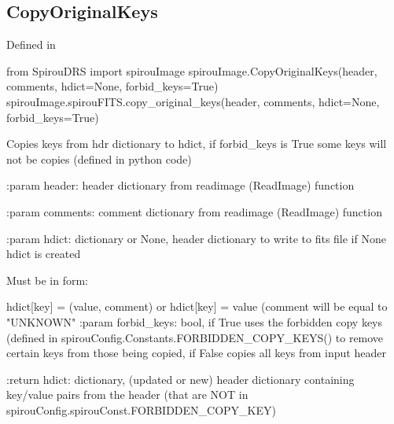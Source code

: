 
\noindent\begin{minipage}{\textwidth}
\subsection{CopyOriginalKeys}

Defined in \spirouImage{}

\begin{pythonbox}
from SpirouDRS import spirouImage
spirouImage.CopyOriginalKeys(header, comments, hdict=None, forbid_keys=True)
spirouImage.spirouFITS.copy_original_keys(header, comments, hdict=None, forbid_keys=True)
\end{pythonbox}

\begin{pythondocstring}
Copies keys from hdr dictionary to hdict, if forbid_keys is True some
keys will not be copies (defined in python code)

:param header: header dictionary from readimage (ReadImage) function

:param comments: comment dictionary from readimage (ReadImage) function

:param hdict: dictionary or None, header dictionary to write to fits file
              if None hdict is created

            Must be in form:

                    hdict[key] = (value, comment)
            or
                    hdict[key] = value     (comment will be equal to
                                            "UNKNOWN"
:param forbid_keys: bool, if True uses the forbidden copy keys (defined in
                    spirouConfig.Constants.FORBIDDEN_COPY_KEYS() to remove
                    certain keys from those being copied, if False copies
                    all keys from input header

:return hdict: dictionary, (updated or new) header dictionary containing
               key/value pairs from the header (that are NOT in
               spirouConfig.spirouConst.FORBIDDEN_COPY_KEY)
\end{pythondocstring}
\end{minipage}



